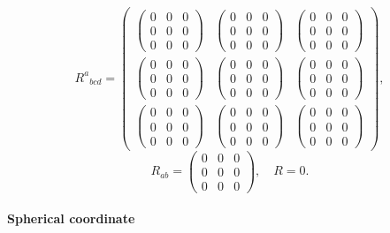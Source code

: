 \documentclass[11pt]{article}
\begin{document}
$${R^{a}}_{bcd}=\begin{pmatrix} \begin{pmatrix} 0 & 0 & 0\\ 0 & 0 & 0\\ 0 & 0 & 0 \end{pmatrix} & \begin{pmatrix} 0 & 0 & 0\\ 0 & 0 & 0\\ 0 & 0 & 0 \end{pmatrix} & \begin{pmatrix} 0 & 0 & 0\\ 0 & 0 & 0\\ 0 & 0 & 0 \end{pmatrix}\\ \begin{pmatrix} 0 & 0 & 0\\ 0 & 0 & 0\\ 0 & 0 & 0 \end{pmatrix} & \begin{pmatrix} 0 & 0 & 0\\ 0 & 0 & 0\\ 0 & 0 & 0 \end{pmatrix} & \begin{pmatrix} 0 & 0 & 0\\ 0 & 0 & 0\\ 0 & 0 & 0 \end{pmatrix}\\ \begin{pmatrix} 0 & 0 & 0\\ 0 & 0 & 0\\ 0 & 0 & 0 \end{pmatrix} & \begin{pmatrix} 0 & 0 & 0\\ 0 & 0 & 0\\ 0 & 0 & 0 \end{pmatrix} & \begin{pmatrix} 0 & 0 & 0\\ 0 & 0 & 0\\ 0 & 0 & 0 \end{pmatrix} \end{pmatrix},$$
$$R_{ab}=\begin{pmatrix} 0 & 0 & 0\\ 0 & 0 & 0\\ 0 & 0 & 0 \end{pmatrix},\quad R=0.$$

    
    \hypertarget{spherical-coordinate}{%
\paragraph{Spherical coordinate}\label{spherical-coordinate}}
\end{document}
